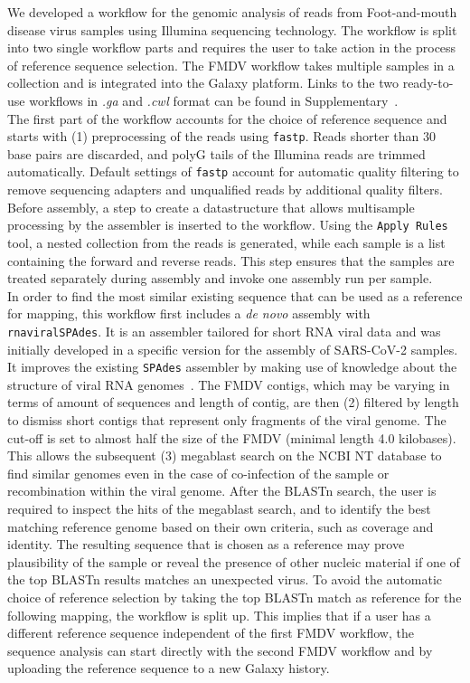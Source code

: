 We developed a workflow for the genomic analysis of reads from Foot-and-mouth disease virus samples using Illumina sequencing technology. The workflow is split into two single workflow parts and requires the user to take action in the process of reference sequence selection. The \ac{FMDV} workflow takes multiple samples in a collection and is integrated into the Galaxy platform. Links to the two ready-to-use workflows in \textit{.ga} and \textit{.cwl} format can be found in Supplementary~. \\

The first part of the workflow accounts for the choice of reference sequence and starts with (1) preprocessing of the reads using \texttt{fastp}. Reads shorter than 30 base pairs are discarded, and polyG tails of the Illumina reads are trimmed automatically. Default settings of \texttt{fastp} account for automatic quality filtering to remove sequencing adapters and unqualified reads by additional quality filters. Before assembly, a step to create a datastructure that allows multisample processing by the assembler is inserted to the workflow. Using the \texttt{Apply Rules} tool, a nested collection from the reads is generated, while each sample is a list containing the forward and reverse reads. This step ensures that the samples are treated separately during assembly and invoke one assembly run per sample.\\
In order to find the most similar existing sequence that can be used as a reference for mapping, this workflow first includes a \textit{de novo} assembly with \texttt{rnaviralSPAdes}. It is an assembler tailored for short \ac{RNA} viral data and was initially developed in a specific version for the assembly of \ac{SARS-CoV-2} samples. It improves the existing \texttt{SPAdes} assembler by making use of knowledge about the structure of viral \ac{RNA} genomes~\cite{meleshko2022coronaspades}. 
The \ac{FMDV} contigs, which may be varying in terms of amount of sequences and length of contig, are then (2) filtered by length to dismiss short contigs that represent only fragments of the viral genome. The cut-off is set to almost half the size of the \ac{FMDV} (minimal length 4.0 kilobases). This allows the subsequent (3) megablast search on the \ac{NCBI} NT database to find similar genomes even in the case of co-infection of the sample or recombination within the viral genome. After the \ac{BLAST}n search, the user is required to inspect the hits of the megablast search, and to identify the best matching reference genome based on their own criteria, such as coverage and identity. The resulting sequence that is chosen as a reference may prove plausibility of the sample or reveal the presence of other nucleic material if one of the top \ac{BLAST}n results matches an unexpected virus. To avoid the automatic choice of reference selection by taking the top \ac{BLAST}n match as reference for the following mapping, the workflow is split up. This implies that if a user has a different reference sequence independent of the first \ac{FMDV} workflow, the sequence analysis can start directly with the second \ac{FMDV} workflow and by uploading the reference sequence to a new Galaxy history.

